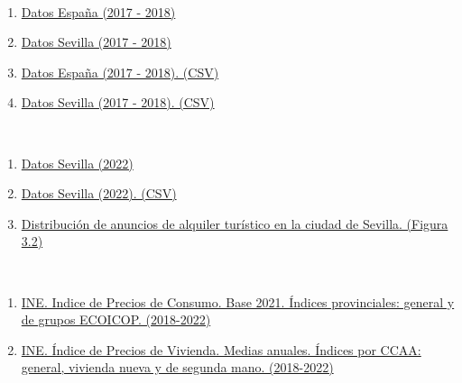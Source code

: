 \documentclass[a4paper,10pt]{article}
\begin{document}
    \begin{thebibliography}{20}

                \ 
                \begin{enumerate}
                    \item \href{https://datahippo.org/es/region/599216cb8a4655339b819813/}{Datos España (2017 - 2018)}
                    \item \href{https://datahippo.org/es/region/599230af8a46554edf884651/}{Datos Sevilla (2017 - 2018)}
                    \item \href{https://datahippo.org/media/regions/58612732-b2dc-433b-ab78-b8fbe5bbbb16/599216cb8a4655339b819813_airbnb.csv}{Datos España (2017 - 2018). (CSV)}
                    \item \href{https://datahippo.org/media/regions/7e3f7365-8ec0-42f1-a277-9b82743b8a39/599230af8a46554edf884651_airbnb.csv}{Datos Sevilla (2017 - 2018). (CSV)}
                \end{enumerate}
            
                \
                \begin{enumerate}
                    \item \href{http://insideairbnb.com/get-the-data/}{Datos Sevilla (2022)}
                    \item \href{http://data.insideairbnb.com/spain/andaluc%C3%ADa/sevilla/2023-03-31/visualisations/listings.csv}{Datos Sevilla (2022). (CSV)}
                    \item \href{http://insideairbnb.com/sevilla}{Distribución de anuncios de alquiler turístico en la ciudad de Sevilla. (Figura 3.2)}
                \end{enumerate}

                \
                \begin{enumerate}
                    \item \href{https://www.ine.es/jaxiT3/Tabla.htm?t=50918&L=0}{INE. Indice de Precios de Consumo. Base 2021. Índices provinciales: general y de grupos ECOICOP. (2018-2022)}
                    \item \href{https://www.ine.es/jaxiT3/Tabla.htm?t=25173}{INE. Índice de Precios de Vivienda. Medias anuales. Índices por CCAA: general, vivienda nueva y de segunda mano. (2018-2022)}
                \end{enumerate}

    \end{thebibliography}
        
\end{document}
